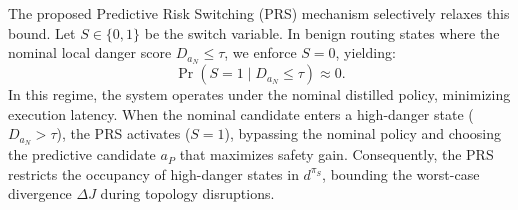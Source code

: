 The proposed Predictive Risk Switching (PRS) mechanism selectively relaxes this bound. Let $S \in \{0, 1\}$ be the switch variable. In benign routing states where the nominal local danger score $D_{a_N} \le \tau$, we enforce $S=0$, yielding:
\begin{equation}
    \Pr(S=1 \mid D_{a_N} \le \tau) \approx 0.
\end{equation}
In this regime, the system operates under the nominal distilled policy, minimizing execution latency. When the nominal candidate enters a high-danger state ($D_{a_N} > \tau$), the PRS activates ($S=1$), bypassing the nominal policy and choosing the predictive candidate $a_P$ that maximizes safety gain. Consequently, the PRS restricts the occupancy of high-danger states in $d^{\pi_S}$, bounding the worst-case divergence $\Delta J$ during topology disruptions.


